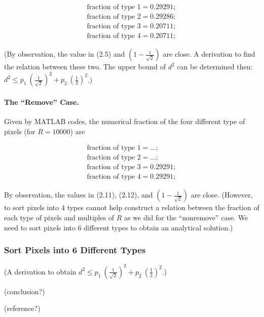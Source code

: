 \documentclass[letterpaper]{article}
\numberwithin{equation}{section} %
\numberwithin{figure}{section} %
\numberwithin{table}{section} %
\begin{document}
\begin{align} 
\text{fraction of type 1}=0.29291; \\
\text{fraction of type 2}=0.29286; \\
\text{fraction of type 3}=0.20711; \\
\text{fraction of type 4}=0.20711; 
\end{align}

(By observation, the value in (2.5) and $(1-\frac{1}{\sqrt{2}})$ are close. A derivation to find the relation between these two. The upper bound of $d^2$ can be determined then: $d^2 \leq p_1 \ (\frac{1}{\sqrt{2}})^2 + p_2 \ (\frac{1}{2})^2 $.)

\paragraph{The \enquote{Remove} Case.}
	
Given by MATLAB codes, the numerical fraction of the four different type of pixels (for $R=10000$) are 

\begin{align} 
\text{fraction of type 1}=...; \\
\text{fraction of type 2}=...; \\
\text{fraction of type 3}=0.29291; \\
\text{fraction of type 4}=0.29291; 
\end{align}

By observation, the values in (2.11), (2.12), and $(1-\frac{1}{\sqrt{2}})$ are close. (However, to sort pixels into 4 types cannot help construct a relation between the fraction of each type of pixels and multiples of $R$ as we did for the \enquote{nonremove} case. We need to sort pixels into 6 different types to obtain an analytical solution.)

\subsubsection{Sort Pixels into 6 Different Types}

(A derivation to obtain $d^2 \leq p_1 \ (\frac{1}{\sqrt{2}})^2 + p_2 \ (\frac{1}{2})^2 $.)

(conclusion?)

(reference?)
\end{document}
